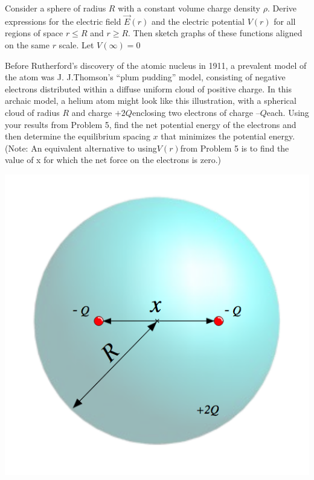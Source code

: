 \documentclass[11pt,letterpaper,boxed]{hmcpset}
\begin{document}
\begin{problem}[5]
Consider a sphere of radius $R$ with a constant volume charge density $\rho$. Derive expressions for the electric field $ \vec{E}(r)$ and the electric potential $V(r)$ for all regions of space $r \leq R$ and $r \geq R$. Then sketch graphs of these functions aligned on the same $r$ scale. Let $V (\infty) = 0$
\end{problem}

\begin{solution}
\vfill
\end{solution}
\newpage

\begin{problem}[HRK E29.29]
Before Rutherford’s discovery of the atomic nucleus in 
1911, a prevalent model of the atom was J. J.Thomson’s “plum pudding” model, consisting of negative electrons  distributed within a  diffuse uniform cloud of positive charge.  In this archaic model, a helium atom might look like this illustration, with a spherical cloud of radius $R$ and charge $+2Q$enclosing two electrons of charge $–Q$each. Using your results from Problem 5, find the net potential energy of the electrons and then determine the equilibrium spacing $x$ that minimizes the potential energy.  (Note:  An equivalent alternative to using$V(r)$from Problem 5 is to find the value of x for which the net force on the electrons is zero.) 
\begin{center}
\includegraphics[scale=0.6]{Rutherford.png}
\end{center}
\end{problem}

\begin{solution}
\vfill
\end{solution}
\end{document}
